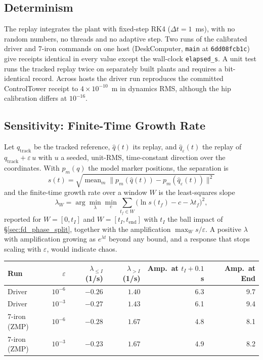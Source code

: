 \documentclass[11pt,a4paper]{article}
\begin{document}
\subsection{Determinism}
The replay integrates the plant with fixed-step RK4 ($\Delta t = 1$~ms), with
no random numbers, no threads and no adaptive step. Two runs of the
calibrated driver and 7-iron commands on one host (DeskComputer,
\texttt{main} at \texttt{6dd08fcb1c}) give receipts identical in every value
except the wall-clock \texttt{elapsed\_s}. A unit test runs the tracked
replay twice on separately built plants and requires a bit-identical
record. Across hosts the driver run reproduces the committed ControlTower
receipt to $4\times10^{-10}$~m in dynamics RMS, although the hip calibration
differs at $10^{-16}$.

\subsection{Sensitivity: Finite-Time Growth Rate}
Let $q_\mathrm{track}$ be the tracked reference, $\hat q(t)$ its replay, and
$\hat q_\varepsilon(t)$ the replay of $q_\mathrm{track} + \varepsilon\,u$ with
$u$ a seeded, unit-RMS, time-constant direction over the coordinates. With
$p_m(q)$ the model marker positions, the separation is
\[
  s(t) = \sqrt{\operatorname{mean}_m \lVert p_m(\hat q(t)) - p_m(\hat q_\varepsilon(t)) \rVert^2}
\]
and the finite-time growth rate over a window $W$ is the least-squares slope
\[
  \lambda_W = \arg\min_{\lambda} \min_{c} \sum_{t_f \in W} \bigl(\ln s(t_f) - c - \lambda t_f\bigr)^2 ,
\]
reported for $W = [0, t_I]$ and $W = [t_I, t_\mathrm{end}]$ with $t_I$ the
ball impact of \S\ref{sec:fd_phase_split}, together with the amplification
$\max_W s / \varepsilon$. A positive $\lambda$ with amplification growing as
$e^{\lambda t}$ beyond any bound, and a response that stops scaling with
$\varepsilon$, would indicate chaos.

\begin{center}
\begin{tabular}{lrrrrr}
\hline
Run & $\varepsilon$ & $\lambda_{\le I}$ (1/s) & $\lambda_{>I}$ (1/s) & Amp.\ at $t_I + 0.1$~s & Amp.\ at End \\
\hline
Driver & $10^{-6}$ & $-0.26$ & $1.40$ & 6.3 & 9.7 \\
Driver & $10^{-3}$ & $-0.27$ & $1.43$ & 6.1 & 9.4 \\
7-iron (ZMP) & $10^{-6}$ & $-0.28$ & $1.67$ & 4.8 & 8.1 \\
7-iron (ZMP) & $10^{-3}$ & $-0.23$ & $1.67$ & 4.9 & 8.2 \\
\hline
\end{tabular}
\end{center}
\end{document}
